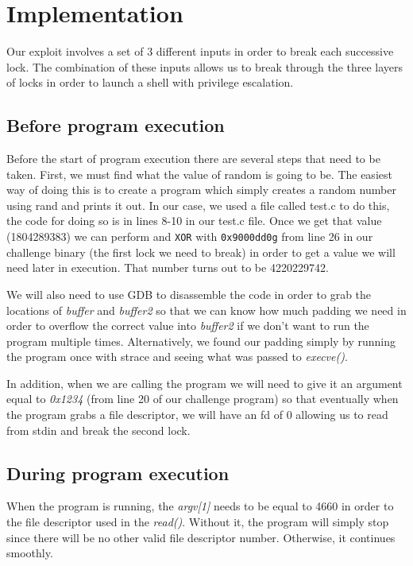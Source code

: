 \section{Implementation}
\label{sec:implementation}
Our exploit involves a set of 3 different inputs in order to break each successive lock. The combination of these inputs allows us to break through the three layers of locks in order to launch a shell with privilege escalation. 

\subsection{Before program execution}
Before the start of program execution there are several steps that need to be taken. First, we must find what the value of random is going to be. The easiest way of doing this is to create a program which simply creates a random number using rand and prints it out. In our case, we used a file called test.c to do this, the code for doing so is in lines 8-10 in our test.c file. Once we get that value (1804289383) we can perform and {\tt XOR} with {\tt 0x9000dd0g} from line 26 in our challenge binary (the first lock we need to break) in order to get a value we will need later in execution. That number turns out to be 4220229742.

We will also need to use GDB to disassemble the code in order to grab the locations of \emph{buffer} and \emph{buffer2} so that we can know how much padding we need in order to overflow the correct value into \emph{buffer2} if we don't want to run the program multiple times. Alternatively, we found our padding simply by running the program once with strace and seeing what was passed to \emph{execve()}. 

In addition, when we are calling the program we will need to give it an argument equal to \emph{0x1234} (from line 20 of our challenge program) so that eventually when the program grabs a file descriptor, we will have an fd of 0 allowing us to read from stdin and break the second lock.

\subsection{During program execution}
When the program is running, the \emph{argv[1]} needs to be equal to 4660 in order to the file descriptor used in the \emph{read()}. Without it, the program will simply stop since there will be no other valid file descriptor number. Otherwise, it continues smoothly.


